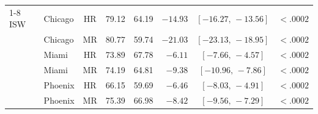 \begin{table}[h]
\begin{tabular}{@{}llcrrrcr@{}}
\cmidrule(l){1-8}
ISW       & Chicago & HR & 79.12 & 64.19 & $-14.93$ & $[-16.27,\,-13.56]$ & $<\!.0002$ \\
          & Chicago & MR & 80.77 & 59.74 & $-21.03$ & $[-23.13,\,-18.95]$ & $<\!.0002$ \\
          & Miami   & HR & 73.89 & 67.78 & $-6.11$  & $[-7.66,\,-4.57]$   & $<\!.0002$ \\
          & Miami   & MR & 74.19 & 64.81 & $-9.38$  & $[-10.96,\,-7.86]$  & $<\!.0002$ \\
          & Phoenix & HR & 66.15 & 59.69 & $-6.46$  & $[-8.03,\,-4.91]$   & $<\!.0002$ \\
          & Phoenix & MR & 75.39 & 66.98 & $-8.42$  & $[-9.56,\,-7.29]$   & $<\!.0002$ \\
\bottomrule
\end{tabular}
\end{table}

